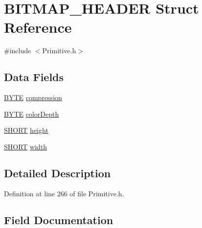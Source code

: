 \hypertarget{struct_b_i_t_m_a_p___h_e_a_d_e_r}{}\section{B\+I\+T\+M\+A\+P\+\_\+\+H\+E\+A\+D\+E\+R Struct Reference}
\label{struct_b_i_t_m_a_p___h_e_a_d_e_r}


{\ttfamily \#include $<$Primitive.\+h$>$}

\subsection*{Data Fields}
\begin{DoxyCompactItemize}
\item 
\hyperlink{_generic_type_defs_8h_a4ae1dab0fb4b072a66584546209e7d58}{B\+Y\+T\+E} \hyperlink{struct_b_i_t_m_a_p___h_e_a_d_e_r_afa5ab09f56b94d033995b498fee9c588}{compression}
\item 
\hyperlink{_generic_type_defs_8h_a4ae1dab0fb4b072a66584546209e7d58}{B\+Y\+T\+E} \hyperlink{struct_b_i_t_m_a_p___h_e_a_d_e_r_a0b8e695698df7a481e3759e313be9b4b}{color\+Depth}
\item 
\hyperlink{_generic_type_defs_8h_ae9bb25d3afecf3bfab0fbe3c22c2050f}{S\+H\+O\+R\+T} \hyperlink{struct_b_i_t_m_a_p___h_e_a_d_e_r_a446d0b29e07b5825c7bcfcbbde8e09dd}{height}
\item 
\hyperlink{_generic_type_defs_8h_ae9bb25d3afecf3bfab0fbe3c22c2050f}{S\+H\+O\+R\+T} \hyperlink{struct_b_i_t_m_a_p___h_e_a_d_e_r_a4c227e70da0634898f5d8b65b47b3d63}{width}
\end{DoxyCompactItemize}


\subsection{Detailed Description}


Definition at line 266 of file Primitive.\+h.



\subsection{Field Documentation}
\hypertarget{struct_b_i_t_m_a_p___h_e_a_d_e_r_a0b8e695698df7a481e3759e313be9b4b}{}
